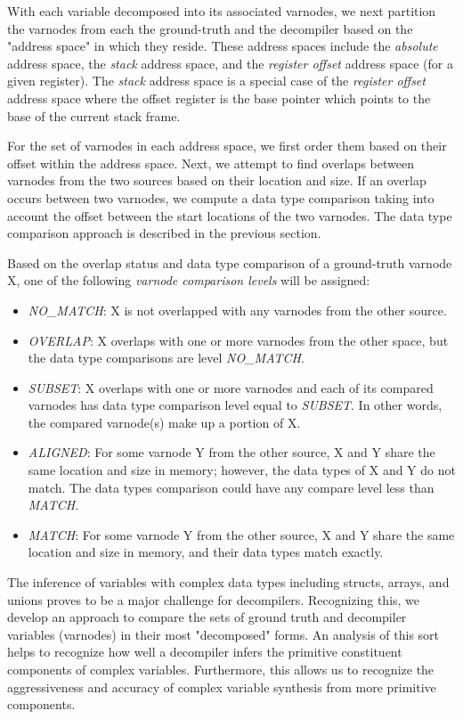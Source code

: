 \documentclass[conference]{IEEEtran}
\begin{document}
With each variable decomposed into its associated varnodes, we next partition the varnodes from each the ground-truth and the decompiler based on the "address space" in which they reside. These address spaces include the \emph{absolute} address space, the \emph{stack} address space, and the \emph{register offset} address space (for a given register). The \emph{stack} address space is a special case of the \emph{register offset} address space where the offset register is the base pointer which points to the base of the current stack frame.

For the set of varnodes in each address space, we first order them based on their offset within the address space. Next, we attempt to find overlaps between varnodes from the two sources based on their location and size. If an overlap occurs between two varnodes, we compute a data type comparison taking into account the offset between the start locations of the two varnodes. The data type comparison approach is described in the previous section.

Based on the overlap status and data type comparison of a ground-truth varnode X, one of the following \emph{varnode comparison levels} will be assigned:

\begin{itemize}
    \item \emph{NO\_MATCH}: X is not overlapped with any varnodes from the other source.
    \item \emph{OVERLAP}: X overlaps with one or more varnodes from the other space, but the data type comparisons are level \emph{NO\_MATCH}.
    \item \emph{SUBSET}: X overlaps with one or more varnodes and each of its compared varnodes has data type comparison level equal to \emph{SUBSET}. In other words, the compared varnode(s) make up a portion of X.
    \item \emph{ALIGNED}: For some varnode Y from the other source, X and Y share the same location and size in memory; however, the data types of X and Y do not match. The data types comparison could have any compare level less than \emph{MATCH}.
    \item \emph{MATCH}: For some varnode Y from the other source, X and Y share the same location and size in memory, and their data types match exactly.
\end{itemize}


The inference of variables with complex data types including structs, arrays, and unions proves to be a major challenge for decompilers. Recognizing this, we develop an approach to compare the sets of ground truth and decompiler variables (varnodes) in their most "decomposed" forms. An analysis of this sort helps to recognize how well a decompiler infers the primitive constituent components of complex variables. Furthermore, this allows us to recognize the aggressiveness and accuracy of complex variable synthesis from more primitive components.
\end{document}
